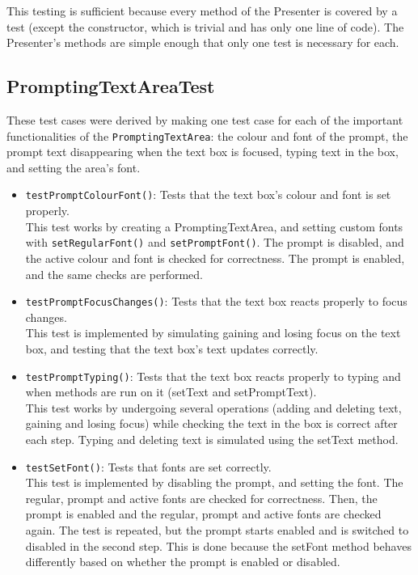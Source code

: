 \documentclass[11pt]{article}
\begin{document}
This testing is sufficient because every method of the Presenter is covered by a test (except the constructor, which is trivial and has only one line of code).  The Presenter's methods are simple enough that only one test is necessary for each.\\
\subsection{PromptingTextAreaTest}
\label{sec:org6d96e3a}
These test cases were derived by making one test case for each of the important functionalities of the \texttt{PromptingTextArea}: the colour and font of the prompt, the prompt text disappearing when the text box is focused, typing text in the box, and setting the area's font.\\
\begin{itemize}
\item \texttt{testPromptColourFont()}: Tests that the text box's colour and font is set properly.\\
This test works by creating a PromptingTextArea, and setting custom fonts with \texttt{setRegularFont()} and \texttt{setPromptFont()}.  The prompt is disabled, and the active colour and font is checked for correctness.  The prompt is enabled, and the same checks are performed.\\
\item \texttt{testPromptFocusChanges()}: Tests that the text box reacts properly to focus changes.\\
This test is implemented by simulating gaining and losing focus on the text box, and testing that the text box's text updates correctly.\\
\item \texttt{testPromptTyping()}: Tests that the text box reacts properly to typing and when methods are run on it (setText and setPromptText).\\
This test works by undergoing several operations (adding and deleting text, gaining and losing focus) while checking the text in the box is correct after each step.  Typing and deleting text is simulated using the setText method.\\
\item \texttt{testSetFont()}: Tests that fonts are set correctly.\\
This test is implemented by disabling the prompt, and setting the font.  The regular, prompt and active fonts are checked for correctness.  Then, the prompt is enabled and the regular, prompt and active fonts are checked again.  The test is repeated, but the prompt starts enabled and is switched to disabled in the second step.  This is done because the setFont method behaves differently based on whether the prompt is enabled or disabled.\\
\end{itemize}
\end{document}
